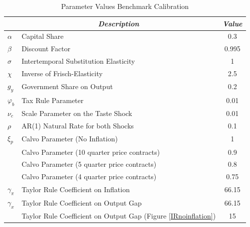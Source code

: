 \documentclass[12pt,a4paper,oneside,titlepage]{article}
\begin{document}
\pagebreak[4]




\newpage

\begin{table}[th]
\centering
\caption{Parameter Values Benchmark Calibration}
\bigskip
\bgroup
\def\arraystretch{1.5}
\begin{tabular}{p{1.2cm} l c}
\toprule\toprule \noalign{\smallskip}
 & \multicolumn{1}{c}{\textit{Description}} & \textit{Value} \\
\hline\noalign{\smallskip}

$\alpha$ & Capital Share   & 0.3 \\
$\beta$  & Discount Factor & 0.995 \\
$\sigma$ & Intertemporal Substitution Elasticity & 1 \\
$\chi$ & Inverse of Frisch-Elasticity & 2.5 \\
$g_y$ & Government Share on Output & 0.2 \\
$\varphi_b$ & Tax Rule Parameter & 0.01 \\
$\nu_c$ & Scale Parameter on the Taste Shock & 0.01 \\
$\rho$ & AR(1) Natural Rate for both Shocks & 0.1 \\
$\xi_p$ & Calvo Parameter (No Inflation) & 1 \\
 & Calvo Parameter (10 quarter price contracts) & 0.9 \\
 & Calvo Parameter (5  quarter price contracts) & 0.8 \\
 & Calvo Parameter (4  quarter price contracts) & 0.75 \\
$\gamma_{\pi}$ & Taylor Rule Coefficient on Inflation & 66.15 \\
$\gamma_x$ & Taylor Rule Coefficient on Output Gap & 66.15 \\
 & Taylor Rule Coefficient on Output Gap (Figure \ref{IRnoinflation}) & 15 \\
\bottomrule
\end{tabular}
\egroup
\label{tab:Tabel1}
\end{table}
\end{document}
